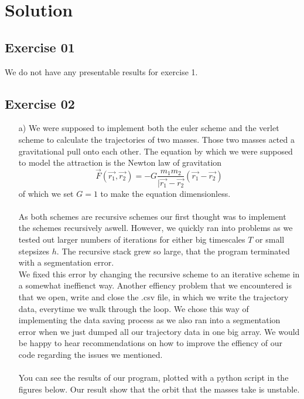 \section{Solution}
\label{sec:solution}
\subsection{Exercise 01}
We do not have any presentable results for exercise 1.
\subsection{Exercise 02}

\begin{itemize}
    \item[a)]
    We were supposed to implement both the euler scheme and the verlet scheme to calculate the trajectories of two masses.
    Those two masses acted a gravitational pull onto each other.
    The equation by which we were supposed to model the attraction is the Newton law of gravitation 
    \begin{equation}
        \vec{F}(\vec{r_1}, \vec{r_2}) = -G \frac{m_1 m_2}{|\vec{r_1} - \vec{r_2}} (\vec{r_1} - \vec{r_2})
    \end{equation}
    of which we set $G=1$ to make the equation dimensionless.\\\\
    As both schemes are recursive schemes our first thought was to implement the schemes recursively aswell.
    However, we quickly ran into problems as we tested out larger numbers of iterations for either big timescales $T$ or small stepsizes $h$.
    The recursive stack grew so large, that the program terminated with a segmentation error.\\
    We fixed this error by changing the recursive scheme to an iterative scheme in a somewhat ineffienct way.
    Another effiency problem that we encountered is that we open, write and close the .csv file, in which we write the trajectory data, everytime we walk through the loop.
    We chose this way of implementing the data saving process as we also ran into a segmentation error when we just dumped all our trajectory data in one big array.
    We would be happy to hear recommendations on how to improve the effiency of our code regarding the issues we mentioned.\\\\
    You can see the results of our program, plotted with a python script in the figures below.
    Our result show that the orbit that the masses take is unstable.

\end{itemize}
